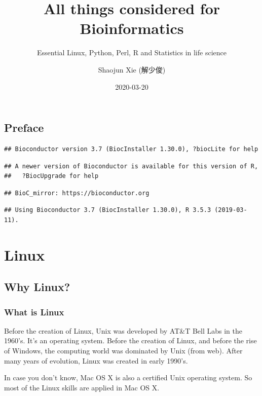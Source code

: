 \documentclass[]{book}
\title{All things considered for Bioinformatics}
\subtitle{Essential Linux, Python, Perl, R and Statistics in life science}
\author{Shaojun Xie (解少俊)}
\date{2020-03-20}
\begin{document}
\maketitle

{
\setcounter{tocdepth}{1}
\tableofcontents
}
\hypertarget{preface}{%
\chapter*{Preface}\label{preface}}

\begin{verbatim}
## Bioconductor version 3.7 (BiocInstaller 1.30.0), ?biocLite for help
\end{verbatim}

\begin{verbatim}
## A newer version of Bioconductor is available for this version of R,
##   ?BiocUpgrade for help
\end{verbatim}

\begin{verbatim}
## BioC_mirror: https://bioconductor.org
\end{verbatim}

\begin{verbatim}
## Using Bioconductor 3.7 (BiocInstaller 1.30.0), R 3.5.3 (2019-03-11).
\end{verbatim}

\hypertarget{part-linux}{%
\part{Linux}\label{part-linux}}

\hypertarget{why-linux}{%
\chapter{Why Linux?}\label{why-linux}}

\hypertarget{what-is-linux}{%
\section{What is Linux}\label{what-is-linux}}

Before the creation of Linux, Unix was developed by AT\&T Bell Labs in the 1960's. It's an operating system. Before the creation of Linux, and before the rise of Windows, the computing world was dominated by Unix (from web). After many years of evolution, Linux was created in early 1990's.

In case you don't know, Mac OS X is also a certified Unix operating system. So most of the Linux skills are applied in Mac OS X.
\end{document}
